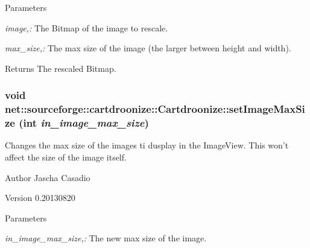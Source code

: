 \begin{DoxyParams}{Parameters}
\item[{\em image,:}]The Bitmap of the image to rescale. \item[{\em max\_\-size,:}]The max size of the image (the larger between height and width). \end{DoxyParams}
\begin{DoxyReturn}{Returns}
The rescaled Bitmap.
\end{DoxyReturn}


\hypertarget{classnet_1_1sourceforge_1_1cartdroonize_1_1Cartdroonize_a6b78247d653025ae6611f27b951d47dd}{
\subsubsection[{setImageMaxSize}]{\setlength{\rightskip}{0pt plus 5cm}void net::sourceforge::cartdroonize::Cartdroonize::setImageMaxSize (int {\em in\_\-image\_\-max\_\-size})}}
\label{classnet_1_1sourceforge_1_1cartdroonize_1_1Cartdroonize_a6b78247d653025ae6611f27b951d47dd}


Changes the max size of the images ti dusplay in the ImageView. This won't affect the size of the image itself. \begin{DoxyAuthor}{Author}
Jascha Casadio 
\end{DoxyAuthor}
\begin{DoxyVersion}{Version}
0.20130820 
\end{DoxyVersion}

\begin{DoxyParams}{Parameters}
\item[{\em in\_\-image\_\-max\_\-size,:}]The new max size of the image.\end{DoxyParams}




